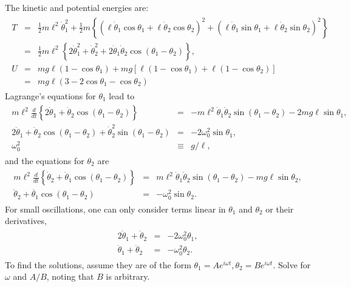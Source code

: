 \documentclass[letterpaper,10pt,english]{sphinxmanual}
\begin{document}
The kinetic and potential energies are:
\begin{equation*}
\begin{split}
\begin{eqnarray*}
T&=&\frac{1}{2}m\ell^2\dot{\theta}_1^2
+\frac{1}{2}m\left\{(\ell\dot{\theta}_1\cos\theta_1+\ell\dot{\theta}_2\cos\theta_2)^2
+(\ell\dot{\theta}_1\sin\theta_1+\ell\dot{\theta}_2\sin\theta_2)^2\right\}\\
&=&\frac{1}{2}m\ell^2\left\{2\dot{\theta}_1^2+\dot{\theta}_2^2+2\dot{\theta}_1\dot{\theta}_2\cos(\theta_1-\theta_2)
\right\},\\
U&=&mg\ell(1-\cos\theta_1)+mg\left[\ell(1-\cos\theta_1)+\ell(1-\cos\theta_2)\right]\\
&=&mg\ell(3-2\cos\theta_1-\cos\theta_2)
\end{eqnarray*}
\end{split}
\end{equation*}
Lagrange’s equations for \(\theta_1\) lead to
\begin{equation*}
\begin{split}
\begin{eqnarray*}
m\ell^2\frac{d}{dt}\left\{2\dot{\theta}_1+\dot{\theta}_2\cos(\theta_1-\theta_2)\right\}&=&
-m\ell^2\dot{\theta}_1\dot{\theta}_2\sin(\theta_1-\theta_2)
-2mg\ell\sin\theta_1,\\
2\ddot{\theta}_1+\ddot{\theta}_2\cos(\theta_1-\theta_2)+\dot{\theta}_2^2\sin(\theta_1-\theta_2)
&=&-2\omega_0^2\sin\theta_1,\\
\omega_0^2&\equiv& g/\ell,
\end{eqnarray*}
\end{split}
\end{equation*}
and the equations for \(\theta_2\) are
\begin{equation*}
\begin{split}
\begin{eqnarray*}
m\ell^2\frac{d}{dt}\left\{\dot{\theta}_2+\dot{\theta}_1\cos(\theta_1-\theta_2)\right\}&=&
m\ell^2\dot{\theta}_1\dot{\theta}_2\sin(\theta_1-\theta_2)-mg\ell\sin\theta_2,\\
\ddot{\theta}_2+\ddot{\theta_1}\cos(\theta_1-\theta_2)&=&
-\omega_0^2\sin\theta_2.
\end{eqnarray*}
\end{split}
\end{equation*}
For small oscillations, one can only consider terms linear in \(\theta_1\) and \(\theta_2\) or their derivatives,
\begin{equation*}
\begin{split}
\begin{eqnarray}
2\ddot{\theta}_1+\ddot{\theta}_2&=&-2\omega_0^2\theta_1,\\
\nonumber
\ddot{\theta}_1+\ddot{\theta}_2&=&-\omega_0^2\theta_2.
\end{eqnarray}
\end{split}
\end{equation*}
To find the solutions, assume they are of the form
\(\theta_1=Ae^{i\omega t}, \theta_2=Be^{i\omega t}\). Solve for \(\omega\)
and \(A/B\), noting that \(B\) is arbitrary.
\end{document}
